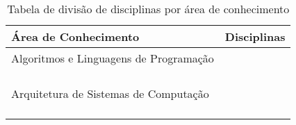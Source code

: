 \begin{table}[ht]
	\centering
	\caption{Tabela de divisão de disciplinas por área de conhecimento}
	\label{tab:areas}
	\begin{tabularx}{\textwidth}{ X  l }
		\hiderowcolors
		\hline
		{\bf Área de Conhecimento}                              & {\bf Disciplinas} \\
		\hline
		\multirow{5}{*}{Algoritmos e Linguagens de Programação} & \AlgComp          \\ %
																& \AnAlg            \\ %
		                                                        & \EstrInf          \\ %
		                                                        & \LabProgA         \\ %
		                                                        & \LabProgB         \\ %
		                                                        & \TeoComp          \\ %
																& \Grafos			\\ \hline
		\multirow{8}{*}{Arquitetura de Sistemas de Computação}  & \ArqComp          \\ %
																& \CompParal        \\ %
		                                                        & \Control          \\ %
		                                                        & \FundIComp         \\ %
																& \FundComp         \\ %
																& \Instala			\\ %
		                                                        & \ProjSO           \\ %
																& \Telep            \\ %
		                                                        & \Sredes         	\\ %
		                                                        & \SistEmb          \\ %

\end{tabularx}
\end{table}
